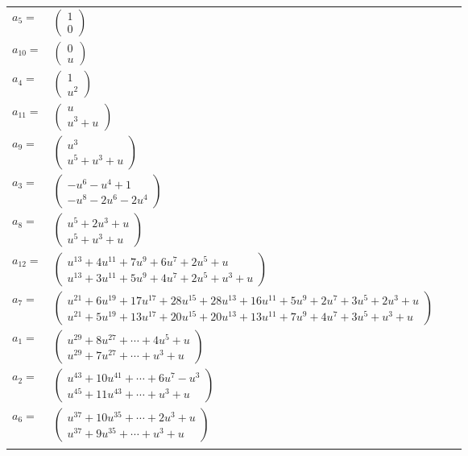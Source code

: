 \documentclass[1p]{elsarticle_modified}
\theoremstyle{definition}
\begin{document}
\begin{tabular}{m{7pt} m{180pt} m{7pt} m{180pt} }
\flushright $a_{5}=$&$\begin{pmatrix}1\\0\end{pmatrix}$ \\
\flushright $a_{10}=$&$\begin{pmatrix}0\\u\end{pmatrix}$ \\
\flushright $a_{4}=$&$\begin{pmatrix}1\\u^2\end{pmatrix}$ \\
\flushright $a_{11}=$&$\begin{pmatrix}u\\u^3+u\end{pmatrix}$ \\
\flushright $a_{9}=$&$\begin{pmatrix}u^3\\u^5+u^3+u\end{pmatrix}$ \\
\flushright $a_{3}=$&$\begin{pmatrix}- u^6- u^4+1\\- u^8-2 u^6-2 u^4\end{pmatrix}$ \\
\flushright $a_{8}=$&$\begin{pmatrix}u^5+2 u^3+u\\u^5+u^3+u\end{pmatrix}$ \\
\flushright $a_{12}=$&$\begin{pmatrix}u^{13}+4 u^{11}+7 u^9+6 u^7+2 u^5+u\\u^{13}+3 u^{11}+5 u^9+4 u^7+2 u^5+u^3+u\end{pmatrix}$ \\
\flushright $a_{7}=$&$\begin{pmatrix}u^{21}+6 u^{19}+17 u^{17}+28 u^{15}+28 u^{13}+16 u^{11}+5 u^9+2 u^7+3 u^5+2 u^3+u\\u^{21}+5 u^{19}+13 u^{17}+20 u^{15}+20 u^{13}+13 u^{11}+7 u^9+4 u^7+3 u^5+u^3+u\end{pmatrix}$ \\
\flushright $a_{1}=$&$\begin{pmatrix}u^{29}+8 u^{27}+\cdots+4 u^5+u\\u^{29}+7 u^{27}+\cdots+u^3+u\end{pmatrix}$ \\
\flushright $a_{2}=$&$\begin{pmatrix}u^{43}+10 u^{41}+\cdots+6 u^7- u^3\\u^{45}+11 u^{43}+\cdots+u^3+u\end{pmatrix}$ \\
\flushright $a_{6}=$&$\begin{pmatrix}u^{37}+10 u^{35}+\cdots+2 u^3+u\\u^{37}+9 u^{35}+\cdots+u^3+u\end{pmatrix}$\\&\end{tabular}
\end{document}
